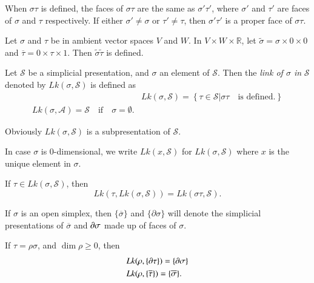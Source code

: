 \begin{ex}\label{chap4-ex4.1.3}
When $\sigma\tau$ is defined, the faces of $\sigma \tau$ are the same as $\sigma'\tau'$, where $\sigma'$ and $\tau'$ are faces of $\sigma$ and $\tau$ respectively. If either $\sigma'\neq \sigma$ or $\tau'\neq \tau$, then $\sigma'\tau'$ is a proper face of $\sigma\tau$.
\end{ex}

\begin{ex}\label{chap4-ex4.1.4}
Let $\sigma$ and $\tau$ be in ambient vector spaces $V$ and $W$. In $V\times W\times \mathbb{R}$, let $\widetilde{\sigma}=\sigma\times 0\times 0$ and $\overline{\tau}=0\times \tau\times 1$. Then $\widetilde{\sigma}\widetilde{\tau}$ is defined. 
\end{ex}

\begin{definition}\label{chap4-defi4.1.5}
Let $\mathscr{S}$ be a simplicial presentation, and $\sigma$ an element of $\mathscr{S}$. Then the {\em link of $\sigma$ in} $\mathscr{S}$ denoted by $Lk(\sigma,\mathscr{S})$ is defined as
\begin{align*}
& Lk(\sigma,\mathscr{S})=\left\{\tau \in\mathscr{S}|\sigma\tau\quad\text{is defined.}\right\}\\
Lk(\sigma,\mathscr{A})=\mathscr{S}\quad \text{if}\quad \sigma=\emptyset.
\end{align*}

Obviously $Lk(\sigma,\mathscr{S})$ is a subpresentation of $\mathscr{S}$. 

In case $\sigma$ is $0$-dimensional, we write $Lk(x,\mathscr{S})$ for $Lk(\sigma,\mathscr{S})$ where $x$ is the unique element in $\sigma$.
\end{definition}

\begin{ex}\label{chap4-ex4.1.6}
If $\tau\in Lk(\sigma,\mathscr{S})$, then
$$
Lk(\tau, Lk(\sigma,\mathscr{S}))=Lk(\sigma\tau,\mathscr{S}).
$$
\end{ex}

\begin{notation}\label{chap4-not4.1.7}
If $\sigma$ is an open simplex, then $\{\overline{\sigma}\}$ and $\{\partial \sigma\}$ will denote the simplicial presentations of $\overline{\sigma}$ and $\partial \sigma$ made up of faces of $\sigma$.
\end{notation}

\begin{ex}\label{chap4-ex4.1.8}
If $\tau=\rho\sigma$, and $\dim \rho\geq 0$, then
\begin{align*}
& Lk(\rho,\{\partial \tau\})=\{\partial \sigma\}\\
& Lk(\rho,\{\overline{\tau}\})=\{\overline{\sigma}\}.
\end{align*}
\end{ex}

